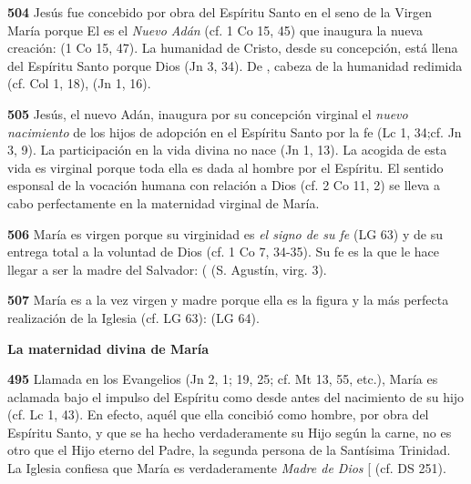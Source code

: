 \textbf{504} Jesús fue concebido por obra del Espíritu Santo en el seno de la Virgen María porque El es el \emph{Nuevo Adán} (cf. 1 Co 15, 45) que inaugura la nueva creación:  (1 Co 15, 47). La humanidad de Cristo, desde su concepción, está llena del Espíritu Santo porque Dios  (Jn 3, 34). De , cabeza de la humanidad redimida (cf. Col 1, 18),  (Jn 1, 16).

\textbf{505} Jesús, el nuevo Adán, inaugura por su concepción virginal el \emph{nuevo nacimiento} de los hijos de adopción en el Espíritu Santo por la fe  (Lc 1, 34;cf. Jn 3, 9). La participación en la vida divina no nace  (Jn 1, 13). La acogida de esta vida es virginal porque toda ella es dada al hombre por el Espíritu. El sentido esponsal de la vocación humana con relación a Dios (cf. 2 Co 11, 2) se lleva a cabo perfectamente en la maternidad virginal de María.

\textbf{506} María es virgen porque su virginidad es \emph{el signo de su fe}  (LG 63) y de su entrega total a la voluntad de Dios (cf. 1 Co 7, 34-35). Su fe es la que le hace llegar a ser la madre del Salvador:  ( (S. Agustín, virg. 3).

\textbf{507} María es a la vez virgen y madre porque ella es la figura y la más perfecta realización de la Iglesia (cf. LG 63):  (LG 64).

\textbf{La maternidad divina de María}

\textbf{495} Llamada en los Evangelios  (Jn 2, 1; 19, 25; cf. Mt 13, 55, etc.), María es aclamada bajo el impulso del Espíritu como  desde antes del nacimiento de su hijo (cf. Lc 1, 43). En efecto, aquél que ella concibió como hombre, por obra del Espíritu Santo, y que se ha hecho verdaderamente su Hijo según la carne, no es otro que el Hijo eterno del Padre, la segunda persona de la Santísima Trinidad. La Iglesia confiesa que María es verdaderamente \emph{Madre de Dios} {[}\textquote{Theotokos}{]} (cf. DS 251).

